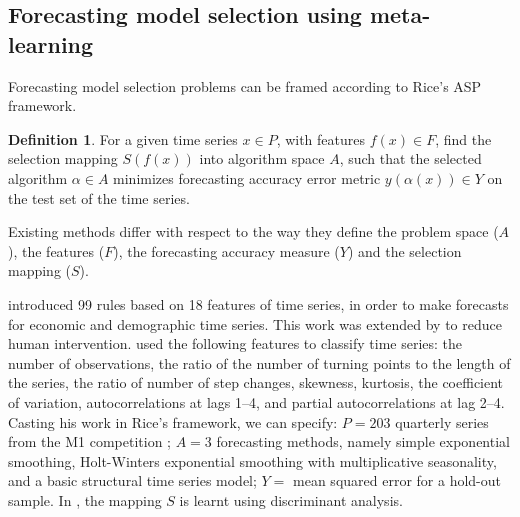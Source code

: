 \documentclass[11pt,a4paper,]{article}
\theoremstyle{definition}
\newtheorem{definition}{Definition}[section]
\theoremstyle{definition}
\theoremstyle{definition}
\theoremstyle{remark}
\begin{document}
\subsection{Forecasting model selection using
meta-learning}\label{forecasting-model-selection-using-meta-learning}

Forecasting model selection problems can be framed according to Rice's
ASP framework.

\begin{definition}
\label{def2}
For a given time series $x \in P$, with features $f(x) \in F$, find the selection mapping $S(f(x))$ into algorithm space $A$, such that the selected algorithm $\alpha \in A$ minimizes forecasting accuracy error metric $y(\alpha(x)) \in Y$ on the test set of the time series.
\end{definition}

Existing methods differ with respect to the way they define the problem
space (\(A\)), the features (\(F\)), the forecasting accuracy measure
(\(Y\)) and the selection mapping (\(S\)).

\textcite{collopy1992rule} introduced 99 rules based on 18 features of
time series, in order to make forecasts for economic and demographic
time series. This work was extended by \textcite{armstrong2001s} to
reduce human intervention. \textcite{shah1997model} used the following
features to classify time series: the number of observations, the ratio
of the number of turning points to the length of the series, the ratio
of number of step changes, skewness, kurtosis, the coefficient of
variation, autocorrelations at lags 1--4, and partial autocorrelations
at lag 2--4. Casting his work in Rice's framework, we can specify:
\(P=203\) quarterly series from the M1 competition
\autocite{makridakis1982accuracy}; \(A=3\) forecasting methods, namely
simple exponential smoothing, Holt-Winters exponential smoothing with
multiplicative seasonality, and a basic structural time series model;
\(Y=\) mean squared error for a hold-out sample. In
\textcite{shah1997model}, the mapping \(S\) is learnt using discriminant
analysis.
\end{document}
